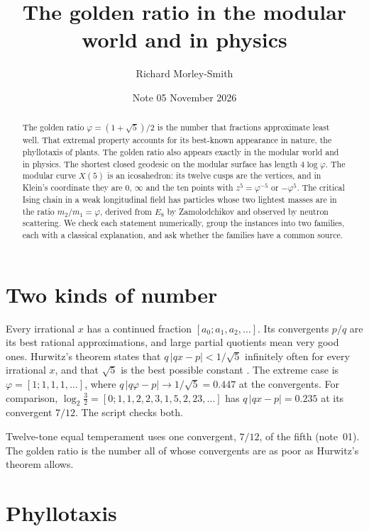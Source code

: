 \documentclass[11pt]{article}
\title{The golden ratio in the modular world and in physics}
\author{Richard Morley-Smith}
\date{Note 05 \quad November 2026}
\begin{document}
\maketitle

\begin{abstract}
\noindent
The golden ratio $\varphi = (1+\sqrt5)/2$ is the number that fractions approximate least well.
That extremal property accounts for its best-known appearance in nature, the phyllotaxis of plants.
The golden ratio also appears exactly in the modular world and in physics.
The shortest closed geodesic on the modular surface has length $4\log\varphi$.
The modular curve $X(5)$ is an icosahedron: its twelve cusps are the vertices, and in Klein's coordinate they are $0$, $\infty$ and the ten points with $z^5 = \varphi^{-5}$ or $-\varphi^5$.
The critical Ising chain in a weak longitudinal field has particles whose two lightest masses are in the ratio $m_2/m_1 = \varphi$, derived from $E_8$ by Zamolodchikov and observed by neutron scattering.
We check each statement numerically, group the instances into two families, each with a classical explanation, and ask whether the families have a common source.
\end{abstract}

\section{Two kinds of number}

Every irrational $x$ has a continued fraction $[a_0;a_1,a_2,\dots]$.
Its convergents $p/q$ are its best rational approximations, and large partial quotients mean very good ones.
Hurwitz's theorem states that $q\,|qx-p| < 1/\sqrt5$ infinitely often for every irrational $x$, and that $\sqrt5$ is the best possible constant \cite{HardyWright}.
The extreme case is $\varphi = [1;1,1,1,\dots]$, where $q\,|q\varphi - p|\to 1/\sqrt5 = 0.447$ at the convergents.
For comparison, $\log_2\frac32 = [0;1,1,2,2,3,1,5,2,23,\dots]$ has $q\,|qx-p| = 0.235$ at its convergent $7/12$.
The script  checks both.

Twelve-tone equal temperament uses one convergent, $7/12$, of the fifth (note~01).
The golden ratio is the number all of whose convergents are as poor as Hurwitz's theorem allows.

\section{Phyllotaxis}
\end{document}
